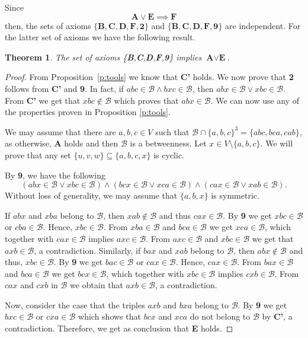 \documentclass{article}
\newtheorem{theorem}[definition]{Theorem}
\newcommand{\calb}{\mathcal{B}}
\begin{document}
Since $$\textbf{A} \lor \textbf{E} \implies \textbf{F}$$ then, the sets of axioms $\{ \textbf{B}, \textbf{C}, \textbf{D}, \textbf{F}, \textbf{2}\}$ and $\{ \textbf{B}, \textbf{C}, \textbf{D}, \textbf{F}, \textbf{9}\}$ are independent. For the latter set of axioms  we have the following result.


\begin{theorem}
	The set of axioms \{\textbf{B},\textbf{C},\textbf{D},\textbf{F},\textbf{9}\} implies $\textbf{A}\lor \textbf{E}$. 
\end{theorem}


\begin{proof}
	From Proposition~\ref{p:tools} we know that \textbf{C'} holds. We now prove that \textbf{2} follows from \textbf{C'} and \textbf{9}. In fact, if $abc\in\calb\land bxc\in  \calb$, then $abx\in  \calb\lor xbc\in  \calb$. From \textbf{C'} we get that $xbc\notin  \calb$ which proves that $abx\in  \calb$.
	We can now use any of the properties proven in Proposition \ref{p:tools}.
	
	We may assume that there are $a,b,c \in V$ such that $ \calb\cap \{a,b,c\}^3=\{abc,bca,cab\}$, as otherwise, \textbf{A} holds and then $\calb$ is a betweenness. Let $x\in V\setminus\{a,b,c\}$. We will prove that any set $\{u,v,w\}\subseteq\{a,b,c,x\}$ is cyclic.  
	
	By \textbf{9}, we have the following $$(abx\in \calb \lor xbc\in \calb)\land (bcx\in \calb\lor xca\in \calb)\land (cax\in \calb\lor xab\in 
	\calb).$$ Without loss of generality, we may assume that $\{a,b,x\}$ is symmetric.
	
	If $abx$ and $xba$ belong to $\calb$, then $xab\notin \calb$ and thus $cax\in \calb$. By \textbf{9} we get $xbc\in \calb$ or $cba\in \calb$. Hence, $xbc\in \calb$. From $xba\in \calb$ and $bca\in \calb$ we get $xca\in \calb$, which together with  $cax\in \calb$ implies $axc\in \calb$. From $axc\in \calb$ and $xbc\in \calb$ we get that $axb\in \calb$, a contradiction. Similarly, if $bax$ and $xab$ belong to $\calb$, then $abx\notin \calb$ and thus, $xbc\in \calb$. By \textbf{9} we get $bac\in \calb$ or $cax\in \calb$. Hence, $cax\in \calb$. From $bax\in \calb$ and $bca\in \calb$ we get $bcx\in \calb$, which together with  $xbc\in \calb$ implies $cxb\in \calb$. From $cax$ and $cxb$ in $\calb$ we obtain that $axb\in \calb$, a contradiction.
	
	Now, consider the case that the triples $axb$ and $bxa$ belong to $\calb$. By \textbf{9} we get $bxc\in \calb$ or $cxa\in \calb$ which shows that $bcx$ and $xca$ do not belong to $\calb$ by \textbf{C'}, a contradiction. Therefore, we get as conclusion that \textbf{E} holds.
\end{proof}
\end{document}
